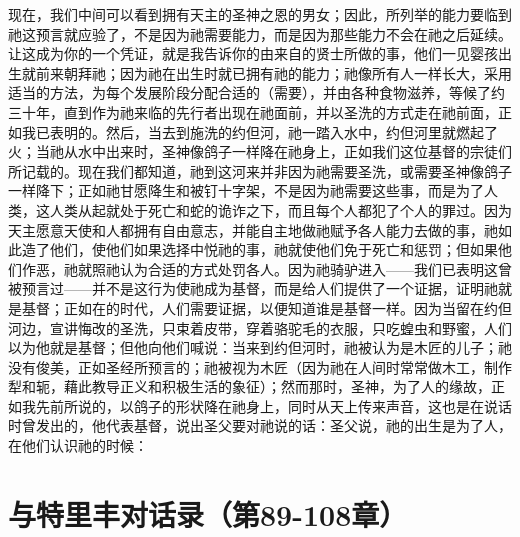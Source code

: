 现在，我们中间可以看到拥有天主的圣神之恩的男女；因此，所列举的能力要临到祂这预言就应验了，不是因为祂需要能力，而是因为那些能力不会在祂之后延续。让这成为你的一个凭证，就是我告诉你的由来自的贤士所做的事，他们一见婴孩出生就前来朝拜祂；因为祂在出生时就已拥有祂的能力；祂像所有人一样长大，采用适当的方法，为每个发展阶段分配合适的（需要），并由各种食物滋养，等候了约三十年，直到作为祂来临的先行者出现在祂面前，并以圣洗的方式走在祂前面，正如我已表明的。然后，当去到施洗的约但河，祂一踏入水中，约但河里就燃起了火；当祂从水中出来时，圣神像鸽子一样降在祂身上，正如我们这位基督的宗徒们所记载的。现在我们都知道，祂到这河来并非因为祂需要圣洗，或需要圣神像鸽子一样降下；正如祂甘愿降生和被钉十字架，不是因为祂需要这些事，而是为了人类，这人类从起就处于死亡和蛇的诡诈之下，而且每个人都犯了个人的罪过。因为天主愿意天使和人都拥有自由意志，并能自主地做祂赋予各人能力去做的事，祂如此造了他们，使他们如果选择中悦祂的事，祂就使他们免于死亡和惩罚；但如果他们作恶，祂就照祂认为合适的方式处罚各人。因为祂骑驴进入——我们已表明这曾被预言过——并不是这行为使祂成为基督，而是给人们提供了一个证据，证明祂就是基督；正如在的时代，人们需要证据，以便知道谁是基督一样。因为当留在约但河边，宣讲悔改的圣洗，只束着皮带，穿着骆驼毛的衣服，只吃蝗虫和野蜜，人们以为他就是基督；但他向他们喊说：当来到约但河时，祂被认为是木匠的儿子；祂没有俊美，正如圣经所预言的；祂被视为木匠（因为祂在人间时常常做木工，制作犁和轭，藉此教导正义和积极生活的象征）；然而那时，圣神，为了人的缘故，正如我先前所说的，以鸽子的形状降在祂身上，同时从天上传来声音，这也是在说话时曾发出的，他代表基督，说出圣父要对祂说的话：圣父说，祂的出生是为了人，在他们认识祂的时候：\par



\section{与特里丰对话录（第89-108章）}

